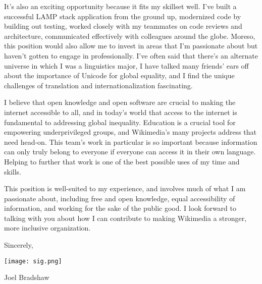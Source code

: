 \documentclass[letterpaper,12pt]{article}
\begin{document}
\begin{paracol}{2}
It's also an exciting opportunity because it fits my skillset well.
I've built a successful LAMP stack application from the ground up, modernized code
by building out testing, worked closely with my teammates on code reviews and architecture,
communicated effectively with colleagues around the globe. Moreso, this position would also allow me to invest
in areas that I'm passionate about but haven't gotten to engage in professionally. I've often
said that there's an alternate universe in which I was a linguistics major, I have talked many friends'
ears off about the importance of Unicode for global equality, and I find the unique challenges
of translation and internationalization fascinating.

I believe that open knowledge and open software are crucial to making the internet accessible
to all, and in today's world that access to the internet is fundamental to addressing global inequality.
Education is a crucial tool for empowering underprivileged groups, and Wikimedia's many projects
address that need head-on. This team's work in particular is so important because information can only
truly belong to everyone if everyone can access it in their own language. Helping to further that
work is one of the best possible uses of my time and skills.

This position is well-suited to my experience, and involves much of what I am passionate about, including
free and open knowledge, equal accessibility of information, and working for the sake of the public
good. I look forward to talking with you about how I can contribute to making Wikimedia a stronger, more
inclusive organization.

Sincerely,

\texttt{[image: sig.png]}

Joel Bradshaw

\flushpage
\end{paracol}
\end{document}
